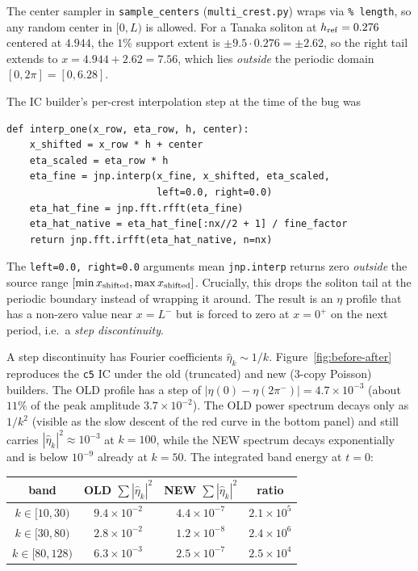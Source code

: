 \documentclass[11pt]{article}
\begin{document}
The center sampler in \verb|sample_centers| (\texttt{multi\_crest.py}) wraps via
\verb|% length|, so any random center in $[0, L)$ is allowed. For a Tanaka
soliton at $h_{\rm ref} = 0.276$ centered at $4.944$, the $1\%$ support extent
is $\pm 9.5 \cdot 0.276 = \pm 2.62$, so the right tail extends to $x = 4.944 +
2.62 = 7.56$, which lies \emph{outside} the periodic domain
$[0, 2\pi] = [0, 6.28]$.

The IC builder's per-crest interpolation step at the time of the bug was

\begin{lstlisting}
def interp_one(x_row, eta_row, h, center):
    x_shifted = x_row * h + center
    eta_scaled = eta_row * h
    eta_fine = jnp.interp(x_fine, x_shifted, eta_scaled,
                          left=0.0, right=0.0)
    eta_hat_fine = jnp.fft.rfft(eta_fine)
    eta_hat_native = eta_hat_fine[:nx//2 + 1] / fine_factor
    return jnp.fft.irfft(eta_hat_native, n=nx)
\end{lstlisting}

The \verb|left=0.0, right=0.0| arguments mean \verb|jnp.interp| returns zero
\emph{outside} the source range $[\min x_{\rm shifted}, \max x_{\rm shifted}]$.
Crucially, this drops the soliton tail at the periodic boundary instead of
wrapping it around. The result is an $\eta$ profile that has a non-zero
value near $x = L^-$ but is forced to zero at $x = 0^+$ on the next period,
i.e.\ a \emph{step discontinuity}.

A step discontinuity has Fourier coefficients $\hat\eta_k \sim 1/k$.
Figure~\ref{fig:before-after} reproduces the \texttt{c5} IC under the old
(truncated) and new (3-copy Poisson) builders. The OLD profile has a step of
$|\eta(0) - \eta(2\pi^-)| = 4.7\times 10^{-3}$ (about $11\%$ of the peak amplitude
$3.7\times 10^{-2}$). The OLD power spectrum decays only as $1/k^2$
(visible as the slow descent of the red curve in the bottom panel) and still
carries $|\hat\eta_k|^2 \approx 10^{-3}$ at $k = 100$, while the NEW spectrum
decays exponentially and is below $10^{-9}$ already at $k = 50$. The integrated
band energy at $t = 0$:

\begin{center}
\begin{tabular}{ccc c}
\toprule
band & OLD $\sum |\hat\eta_k|^2$ & NEW $\sum |\hat\eta_k|^2$ & ratio \\
\midrule
$k \in [10, 30)$ & $9.4\times 10^{-2}$ & $4.4\times 10^{-7}$ & $2.1\times 10^5$ \\
$k \in [30, 80)$ & $2.8\times 10^{-2}$ & $1.2\times 10^{-8}$ & $2.4\times 10^6$ \\
$k \in [80, 128)$ & $6.3\times 10^{-3}$ & $2.5\times 10^{-7}$ & $2.5\times 10^4$ \\
\bottomrule
\end{tabular}
\end{center}
\end{document}
